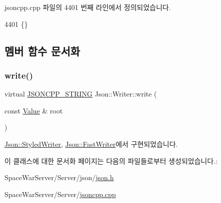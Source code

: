 jsoncpp.\+cpp 파일의 4401 번째 라인에서 정의되었습니다.


\begin{DoxyCode}
4401 \{\}
\end{DoxyCode}


\subsection{멤버 함수 문서화}
\mbox{\label{class_json_1_1_writer_a61c55882b82c7651d0b9b683c6d3f371}} 
\subsubsection{\texorpdfstring{write()}{write()}}
{\footnotesize\ttfamily virtual \hyperlink{json_8h_a1e723f95759de062585bc4a8fd3fa4be}{J\+S\+O\+N\+C\+P\+P\+\_\+\+S\+T\+R\+I\+NG} Json\+::\+Writer\+::write (\begin{DoxyParamCaption}\item[{const \hyperlink{class_json_1_1_value}{Value} \&}]{root }\end{DoxyParamCaption})\hspace{0.3cm}{\ttfamily [pure virtual]}}



\hyperlink{class_json_1_1_styled_writer_a5efab19b9746da9920c29cdae3a6b404}{Json\+::\+Styled\+Writer}, \hyperlink{class_json_1_1_fast_writer_a93d45ba4bc312371d08beb3e3dfbe654}{Json\+::\+Fast\+Writer}에서 구현되었습니다.



이 클래스에 대한 문서화 페이지는 다음의 파일들로부터 생성되었습니다.\+:\begin{DoxyCompactItemize}
\item 
Space\+War\+Server/\+Server/json/\hyperlink{json_8h}{json.\+h}\item 
Space\+War\+Server/\+Server/\hyperlink{jsoncpp_8cpp}{jsoncpp.\+cpp}\end{DoxyCompactItemize}
